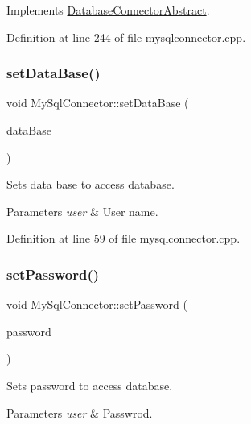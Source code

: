 Implements \mbox{\hyperlink{classDatabaseConnectorAbstract_af482c0b4af4488c5897c04d0c4dff906}{Database\+Connector\+Abstract}}.



Definition at line 244 of file mysqlconnector.\+cpp.

\mbox{\label{classMySqlConnector_a8688bfeb3bb6ba6181f5ce90dc8066d8}} 
\subsubsection{\texorpdfstring{set\+Data\+Base()}{setDataBase()}}
{\footnotesize\ttfamily void My\+Sql\+Connector\+::set\+Data\+Base (\begin{DoxyParamCaption}\item[{const Q\+String}]{data\+Base }\end{DoxyParamCaption})}



Sets data base to access database. 


\begin{DoxyParams}{Parameters}
{\em user} & User name. \\
\hline
\end{DoxyParams}


Definition at line 59 of file mysqlconnector.\+cpp.

\mbox{\label{classMySqlConnector_a92af1c28da0953a69573b21f68b8a41f}} 
\subsubsection{\texorpdfstring{set\+Password()}{setPassword()}}
{\footnotesize\ttfamily void My\+Sql\+Connector\+::set\+Password (\begin{DoxyParamCaption}\item[{const Q\+String}]{password }\end{DoxyParamCaption})}



Sets password to access database. 


\begin{DoxyParams}{Parameters}
{\em user} & Passwrod. \\
\hline
\end{DoxyParams}


